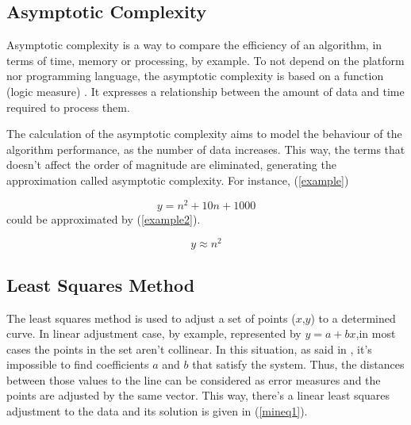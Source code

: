 \documentclass[10pt, conference, compsocconf]{IEEEtran}
\begin{document}
{\subsection{Asymptotic Complexity }

Asymptotic complexity is a way to compare the efficiency of an algorithm,
in terms of time, memory or processing, by example. To not depend on the
platform nor programming language, the asymptotic complexity is based on
a function (logic measure) \cite{complexidade}. It expresses a relationship between the amount
of data and time required to process them. 

The calculation of the asymptotic complexity aims to model the behaviour
of the algorithm performance, as the number of data increases. This way,
the terms that doesn't affect the order of magnitude are eliminated,
generating the approximation called asymptotic complexity. For instance, (\ref{example})

    \begin{equation}
		y = n^{2} +10 n + 1000
	\label{example}
	\end{equation}
could be approximated by (\ref{example2}).

\begin{equation}
		y \approx  n^{2} 
	\label{example2}
	\end{equation}

\subsection{Least Squares Method}

The least squares method is used to adjust a set of points ($x$,$y$) to a
determined curve. In linear adjustment case, by example, represented by $y = a + bx$,in most cases the points in the set aren't collinear. 
In this situation, as said in \cite{minq}, it's impossible to find coefficients
$a$ and $b$ that satisfy the system. Thus, the distances between those values
to the line can be considered as error measures and the points are adjusted 
by the same vector. This way, there's a linear least 
squares adjustment to the data and its solution is given in (\ref{mineq1}).

}
\end{document}

